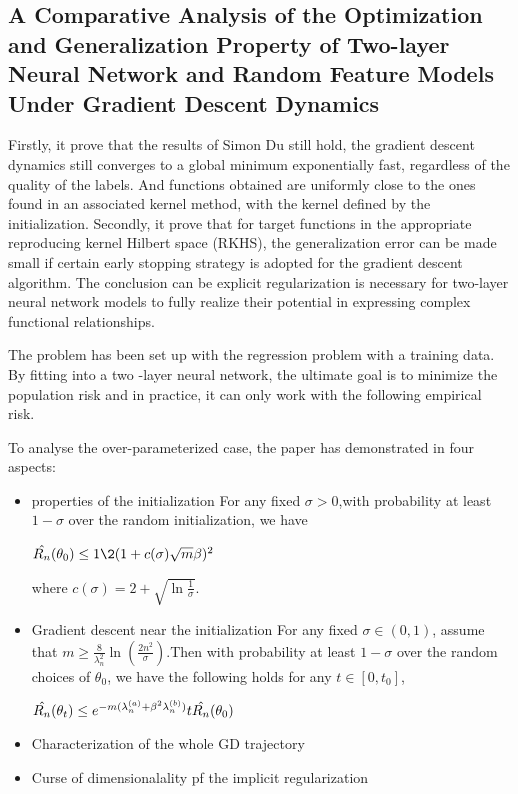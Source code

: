 \documentclass{article}
\begin{document}
\subsection{A Comparative Analysis of the Optimization and Generalization Property of Two-layer Neural Network and Random Feature Models Under Gradient Descent Dynamics}

Firstly, it prove that the results of Simon Du still hold, the gradient descent dynamics still converges to a global minimum exponentially fast, regardless of the quality of the labels. And functions obtained are uniformly close to the ones found in an associated kernel method, with the kernel defined by the initialization. Secondly, it prove that for target functions in the appropriate reproducing kernel Hilbert space (RKHS), the generalization error can be made small if certain early stopping strategy is adopted for the gradient descent algorithm. The conclusion can be explicit regularization is necessary for two-layer neural network models to fully realize their potential in expressing complex functional relationships. 

The problem has been set up with the regression problem with a training data. By fitting into a two -layer neural network, the ultimate goal is to minimize the population risk and in practice, it can only work with the following empirical risk. 

To analyse the over-parameterized case, the paper has demonstrated in four aspects:
\begin{itemize}
\item properties of the initialization 
For any fixed $\sigma > 0$,with probability at least $1-\sigma$ over the random initialization, we have
    \begin{center}
      $\Hat{R_n}(\theta_0)\leq {1\2}(1+c(\sigma)\sqrt{m}\beta)^2$
    \end{center}
where $c(\sigma) = 2+\sqrt{\ln{\frac{1}{\sigma}}}$.

\item Gradient descent near the initialization 
For any fixed $\sigma \in (0,1)$, assume that $m \geq \frac{8}{\lambda_n^2}\ln(\frac{2n^2}{\sigma})$.Then with probability at least $1-\sigma$ over the random choices of $\theta_0$, we have the following holds for any $t\in[0,t_0]$,
    \begin{center}
      $\Hat{R_n}(\theta_t)\leq e^{-m(\lambda_n^{(a)}+\beta^2\lambda_n^{(b)})}t\Hat{R_n}(\theta_0)$
    \end{center}
    
\item Characterization of the whole GD trajectory
\item Curse of dimensionalality pf the implicit regularization
\end{itemize}
\end{document}
